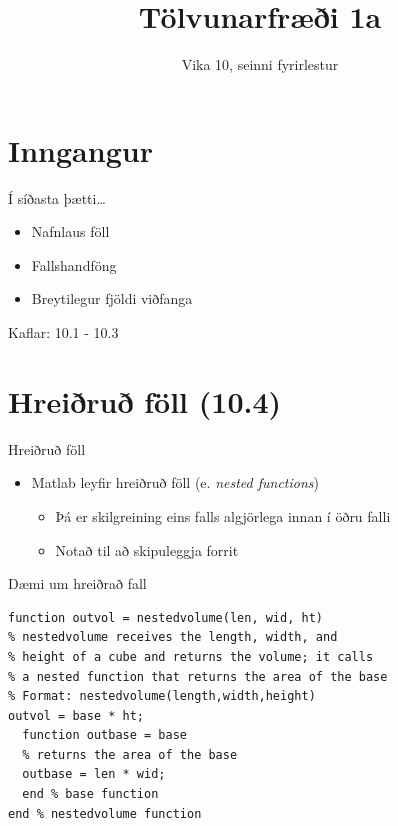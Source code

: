 \documentclass{beamer}
\title{Tölvunarfræði 1a}
\subtitle{Vika 10, seinni fyrirlestur}
\begin{document}
\begin{frame}
\titlepage
\end{frame}

\section{Inngangur}

\begin{frame}{Í síðasta þætti\ldots}
\begin{itemize}
 \item Nafnlaus föll
 \item Fallshandföng
 \item Breytilegur fjöldi viðfanga
\end{itemize}
Kaflar: 10.1 - 10.3 
\end{frame}

\section{Hreiðruð föll (10.4)}

\begin{frame}{Hreiðruð föll}
\begin{itemize}
 \item Matlab leyfir hreiðruð föll (e. \emph{nested functions})
 \begin{itemize}
  \item Þá er skilgreining eins falls algjörlega innan í öðru falli
  \item Notað til að skipuleggja forrit
 \end{itemize}
\end{itemize}
\end{frame}

\begin{frame}[fragile]{Dæmi um hreiðrað fall}
\begin{verbatim}
function outvol = nestedvolume(len, wid, ht)
% nestedvolume receives the length, width, and
% height of a cube and returns the volume; it calls
% a nested function that returns the area of the base
% Format: nestedvolume(length,width,height)
outvol = base * ht;
  function outbase = base
  % returns the area of the base
  outbase = len * wid;
  end % base function
end % nestedvolume function
\end{verbatim}

\end{frame}
\end{document}
